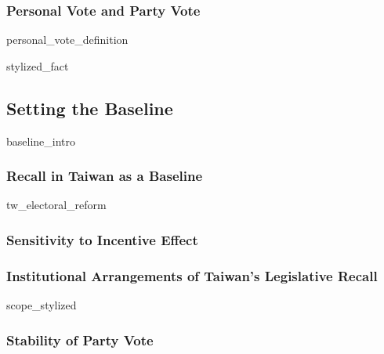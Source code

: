 \documentclass[hyphens, crop=false]{standalone}
\begin{document}
		
		\subsubsection*{Personal Vote and Party Vote}
		{personal_vote_definition}
		
		{stylized_fact}
		
		
	\subsection*{Setting the Baseline}
		
		{baseline_intro}
		
		
		\subsubsection*{Recall in Taiwan as a Baseline}
		
		{tw_electoral_reform}
		
		
		\subsubsection*{Sensitivity to Incentive Effect}
		
		
		
		\subsubsection*{Institutional Arrangements of Taiwan's Legislative Recall}
		
		{scope_stylized}
		
		
		\subsubsection*{Stability of Party Vote}
		
		
		
		
\end{document}
